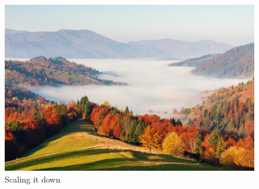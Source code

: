 \documentclass[a4paper]{article}
\begin{document}
\begin{figure}[b!]
    \centering
    \includegraphics[scale=0.05]{ukraine_wikimedia.jpg}
    \caption{Scaling it down}
    \label{fig:ukraine_wikimedia_scaled}
\end{figure}

		
\end{document}
